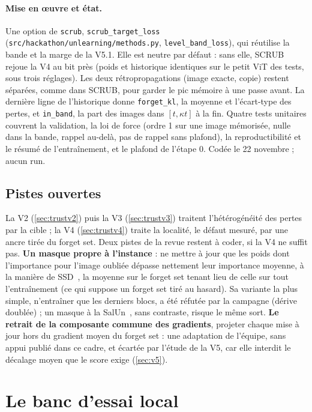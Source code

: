 \documentclass[11pt,a4paper]{article}
\newcommand{\code}[1]{\texttt{#1}}
\newcommand{\chemin}[1]{\nolinkurl{#1}}%
\begin{document}
\paragraph{Mise en œuvre et état.} Une option de \code{scrub}, \code{scrub\_target\_loss}
(\chemin{src/hackathon/unlearning/methods.py}, \code{level\_band\_loss}), qui réutilise la bande et la
marge de la V5.1. Elle est neutre par défaut : sans elle, SCRUB rejoue la V4 au bit près (poids et
historique identiques sur le petit ViT des tests, sous trois réglages). Les deux rétropropagations
(image exacte, copie) restent séparées, comme dans SCRUB, pour garder le pic mémoire à une passe avant.
La dernière ligne de l'historique donne \code{forget\_kl}, la moyenne et l'écart-type des pertes, et
\code{in\_band}, la part des images dans $[t,\kappa t]$ à la fin. Quatre tests unitaires couvrent la
validation, la loi de force (ordre 1 sur une image mémorisée, nulle dans la bande, rappel au-delà, pas
de rappel sans plafond), la reproductibilité et le résumé de l'entraînement, et le plafond de l'étape 0.
Codée le 22 novembre ; aucun run.

\subsection{Pistes ouvertes}\label{sec:pistes}
La V2 (\cref{sec:trustv2}) puis la V3 (\cref{sec:trustv3}) traitent l'hétérogénéité des pertes par
la cible ; la V4 (\cref{sec:trustv4}) traite la localité, le défaut mesuré, par une ancre tirée du
forget set. Deux pistes de la revue restent à coder, si la V4 ne suffit pas. \textbf{Un masque
propre à l'instance} : ne mettre à jour que les poids dont l'importance pour l'image oubliée dépasse
nettement leur importance moyenne, à la manière de SSD~\cite{foster2024ssd}, la moyenne sur le
forget set tenant lieu de celle sur tout l'entraînement (ce qui suppose un forget set tiré au
hasard). Sa variante la plus simple, n'entraîner que les derniers blocs, a été réfutée par la
campagne (dérive doublée) ; un masque à la SalUn~\cite{fan2024salun}, sans contraste, risque le même
sort. \textbf{Le retrait de la composante commune des gradients}, projeter chaque mise à jour hors
du gradient moyen du forget set : une adaptation de l'équipe, sans appui publié dans ce cadre, et
écartée par l'étude de la V5, car elle interdit le décalage moyen que le score exige
(\cref{sec:v5}).

\section{Le banc d'essai local}\label{sec:banc}
\end{document}

